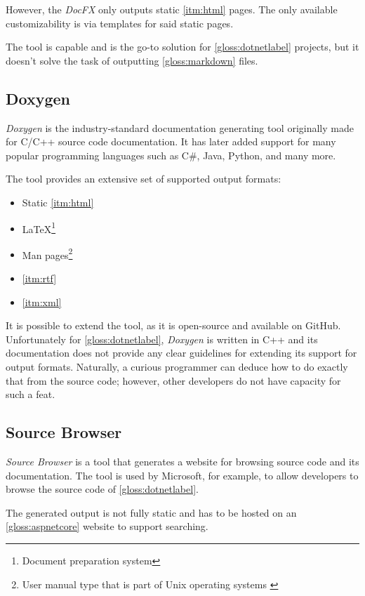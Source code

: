 However, the \textit{DocFX} only outputs static \ref{itm:html} pages. The only available customizability is via templates for said static pages.

The tool is capable and is the go-to solution for \ref{gloss:dotnetlabel} projects, but it doesn't solve the task of outputting \ref{gloss:markdown} files.

\subsection{Doxygen} \label{sec:doxygen}

\textit{Doxygen} is the industry-standard documentation generating tool originally made for C/C++ source code documentation. It has later added support for many popular programming languages such as C\#, Java, Python, and many more.

The tool provides an extensive set of supported output formats:
\begin{itemize}
    \item Static \ref{itm:html}
    \item \LaTeX\footnote{Document preparation system}
    \item Man pages\footnote{User manual type that is part of Unix operating systems \cite{credocs_limited_latex_2022}}
    \item \ref{itm:rtf}
    \item \ref{itm:xml}
\end{itemize}

It is possible to extend the tool, as it is open-source and available on GitHub. Unfortunately for \ref{gloss:dotnetlabel}, \textit{Doxygen} is written in C++ and its documentation does not provide any clear guidelines for extending its support for output formats. Naturally, a curious programmer can deduce how to do exactly that from the source code; however, other developers do not have capacity for such a feat.

\subsection{Source Browser}

\textit{Source Browser} is a tool that generates a website for browsing source code and its documentation. The tool is used by Microsoft, for example, to allow developers to browse the source code of \ref{gloss:dotnetlabel}.

The generated output is not fully static and has to be hosted on an \ref{gloss:aspnetcore} website to support searching.

